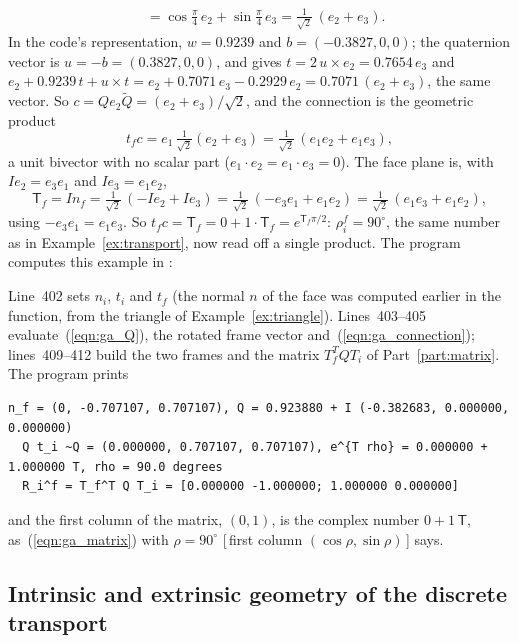 \begin{example}
\begin{align*}
&= \cos\tfrac\pi4\, e_2 + \sin\tfrac\pi4\, e_3 = \tfrac{1}{\sqrt2}\,(e_2 + e_3) .
\end{align*}
In the code's representation, $w = 0.9239$ and $b = (-0.3827, 0, 0)$; the quaternion vector is $u = -b = (0.3827, 0, 0)$, and  gives $t = 2\,u\times e_2 = 0.7654\, e_3$ and $e_2 + 0.9239\, t + u\times t = e_2 + 0.7071\, e_3 - 0.2929\, e_2 = 0.7071\,(e_2 + e_3)$, the same vector. So $c = Q e_2 \widetilde Q = (e_2 + e_3)/\sqrt 2$, and the connection is the geometric product
\begin{equation*}
t_f c = e_1\, \tfrac{1}{\sqrt2}(e_2 + e_3) = \tfrac{1}{\sqrt2}\,(e_1 e_2 + e_1 e_3) ,
\end{equation*}
a unit bivector with no scalar part ($e_1\cdot e_2 = e_1\cdot e_3 = 0$). The face plane is, with $Ie_2 = e_3e_1$ and $Ie_3 = e_1e_2$,
\begin{equation*}
\mathsf T_f = I n_f = \tfrac{1}{\sqrt2}\,(-I e_2 + I e_3) = \tfrac{1}{\sqrt2}\,(-e_3 e_1 + e_1 e_2) = \tfrac{1}{\sqrt2}\,(e_1 e_3 + e_1 e_2) ,
\end{equation*}
using $-e_3e_1 = e_1e_3$. So $t_f c = \mathsf T_f = 0 + 1\cdot\mathsf T_f = e^{\mathsf T_f \pi/2}$: $\rho_i^f = 90^\circ$, the same number as in Example~\ref{ex:transport}, now read off a single product. The program computes this example in :

Line~402 sets $n_i$, $t_i$ and $t_f$ (the normal $n$ of the face was computed earlier in the function, from the triangle of Example~\ref{ex:triangle}). Lines~403--405 evaluate~(\ref{eqn:ga_Q}), the rotated frame vector and~(\ref{eqn:ga_connection}); lines~409--412 build the two frames and the matrix $T_f^T Q T_i$ of Part~\ref{part:matrix}. The program prints
\begin{lstlisting}[numbers=none]
  n_f = (0, -0.707107, 0.707107), Q = 0.923880 + I (-0.382683, 0.000000, 0.000000)
  Q t_i ~Q = (0.000000, 0.707107, 0.707107), e^{T rho} = 0.000000 + 1.000000 T, rho = 90.0 degrees
  R_i^f = T_f^T Q T_i = [0.000000 -1.000000; 1.000000 0.000000]
\end{lstlisting}
and the first column of the matrix, $(0, 1)$, is the complex number $0 + 1\,\mathsf T$, as~(\ref{eqn:ga_matrix}) with $\rho = 90^\circ$ [\,first column $(\cos\rho, \sin\rho)$\,] says.
\end{example}

\subsection{Intrinsic and extrinsic geometry of the discrete transport}
\label{section:ga_intrinsic}


